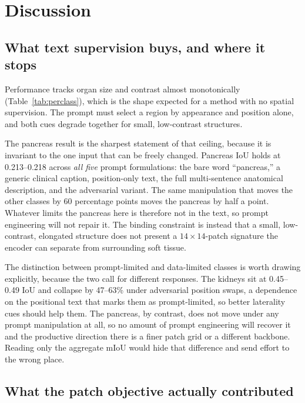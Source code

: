 \section{Discussion}
\label{sec:discussion}

\subsection{What text supervision buys, and where it stops}

Performance tracks organ size and contrast almost monotonically
(Table~\ref{tab:perclass}), which is the shape expected for a method with no
spatial supervision. The prompt must select a region by appearance and position
alone, and both cues degrade together for small, low-contrast structures.

The pancreas result is the sharpest statement of that ceiling, because it is
invariant to the one input that can be freely changed. Pancreas IoU holds at
0.213--0.218 across \emph{all five} prompt formulations: the bare word
``pancreas,'' a generic clinical caption, position-only text, the full
multi-sentence anatomical description, and the adversarial variant. The same
manipulation that moves the other classes by 60 percentage points moves the
pancreas by half a point. Whatever limits the pancreas here is therefore not in
the text, so prompt engineering will not repair it. The binding constraint is
instead that a small, low-contrast, elongated structure does not present
a $14\times14$-patch signature the encoder can separate from surrounding soft
tissue.

The distinction between prompt-limited and data-limited classes is worth drawing
explicitly, because the two call for different responses. The kidneys sit at
0.45--0.49 IoU and collapse by 47--63\% under adversarial position swaps, a
dependence on the positional text that marks them as prompt-limited, so better
laterality cues should help them. The pancreas, by contrast, does not move
under any prompt manipulation at all, so no amount of
prompt engineering will recover it and the productive direction there is a finer
patch grid or a different backbone. Reading only the aggregate mIoU would hide
that difference and send effort to the wrong place.

\subsection{What the patch objective actually contributed}

